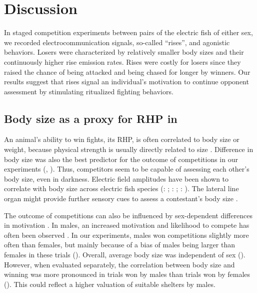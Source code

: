 \section{Discussion} %

In staged competition experiments between pairs of the electric fish \lepto{} of either sex, we recorded electrocommunication signals, so-called ``rises'', and agonistic behaviors. Losers were characterized by relatively smaller body sizes and their continuously
higher rise emission rates. Rises were costly for losers since they raised the chance of being attacked and being chased for longer by winners. Our results suggest that rises signal an individual's motivation to continue opponent assessment by stimulating ritualized fighting behaviors.

\subsection{Body size as a proxy for RHP in \lepto{}}

An animal's ability to win fights, its RHP, is often correlated to body size or weight, because physical strength is usually directly related to size \citep{Parker1974, Archer1988}. Difference in body size was also the best predictor for the outcome of competitions in our experiments (, ). Thus, competitors seem to be capable of assessing each other's body size, even in darkness. Electric field amplitudes have been shown to correlate with body size across electric fish species (\eig{}: \citealp{Westby1981}; \sterno{}: \citealp{Hopkins1972}; \albi{}: \citealp{Knudsen1975}). The lateral line organ might provide further sensory cues to assess a contestant's body size \citep{Butler2015}. 

The outcome of competitions can also be influenced by sex-dependent differences in motivation \citep{EnquistLeimar1987, ArnottElwood2008, Dunham2008}. In males, an increased motivation and likelihood to compete has often been observed \citep{Archer1988}. In our experiments, males won competitions slightly more often than females, but mainly because of a bias of males being larger than females in these trials (). Overall, average body size was independent of sex (). However, when evaluated separately, the correlation between body size and winning was more pronounced in trials won by males than trials won by females (). This could reflect a higher valuation of suitable shelters by males.

